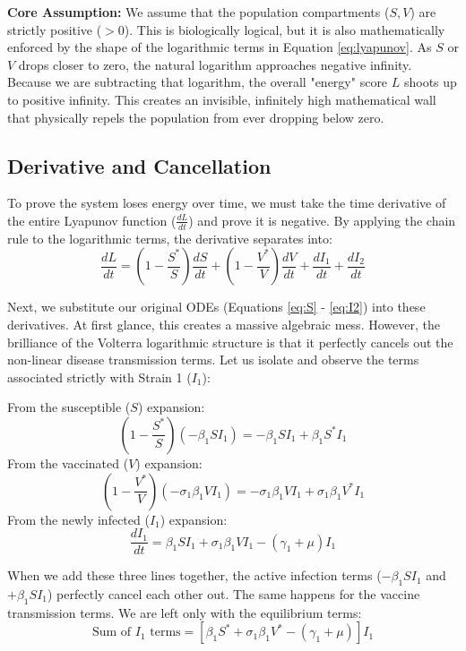 \documentclass[12pt]{article}
\begin{document}
\textbf{Core Assumption:} We assume that the population compartments ($S, V$) are strictly positive ($> 0$). This is biologically logical, but it is also mathematically enforced by the shape of the logarithmic terms in Equation \ref{eq:lyapunov}. As $S$ or $V$ drops closer to zero, the natural logarithm approaches negative infinity. Because we are subtracting that logarithm, the overall "energy" score $L$ shoots up to positive infinity. This creates an invisible, infinitely high mathematical wall that physically repels the population from ever dropping below zero.

\subsection{Derivative and Cancellation}
To prove the system loses energy over time, we must take the time derivative of the entire Lyapunov function ($\frac{dL}{dt}$) and prove it is negative. By applying the chain rule to the logarithmic terms, the derivative separates into:
\begin{equation}
\frac{dL}{dt} = \left(1 - \frac{S^*}{S}\right)\frac{dS}{dt} + \left(1 - \frac{V^*}{V}\right)\frac{dV}{dt} + \frac{dI_1}{dt} + \frac{dI_2}{dt}
\end{equation}

Next, we substitute our original ODEs (Equations \ref{eq:S} - \ref{eq:I2}) into these derivatives. At first glance, this creates a massive algebraic mess. However, the brilliance of the Volterra logarithmic structure is that it perfectly cancels out the non-linear disease transmission terms. Let us isolate and observe the terms associated strictly with Strain 1 ($I_1$):

From the susceptible ($S$) expansion:
\begin{equation*}
\left(1 - \frac{S^*}{S}\right)(-\beta_1 S I_1) = -\beta_1 S I_1 + \beta_1 S^* I_1
\end{equation*}
From the vaccinated ($V$) expansion:
\begin{equation*}
\left(1 - \frac{V^*}{V}\right)(-\sigma_1 \beta_1 V I_1) = -\sigma_1 \beta_1 V I_1 + \sigma_1 \beta_1 V^* I_1
\end{equation*}
From the newly infected ($I_1$) expansion:
\begin{equation*}
\frac{dI_1}{dt} = \beta_1 S I_1 + \sigma_1 \beta_1 V I_1 - (\gamma_1 + \mu)I_1
\end{equation*}

When we add these three lines together, the active infection terms ($-\beta_1 S I_1$ and $+\beta_1 S I_1$) perfectly cancel each other out. The same happens for the vaccine transmission terms. We are left only with the equilibrium terms:
\begin{equation*}
\text{Sum of } I_1 \text{ terms} = \left[ \beta_1 S^* + \sigma_1 \beta_1 V^* - (\gamma_1 + \mu) \right] I_1
\end{equation*}
\end{document}
